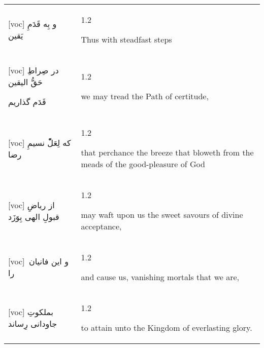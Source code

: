 \documentclass[11pt]{article}
\makeatletter
\newenvironment{orig}
  {\begin{farsi}[voc]}
  {\end{farsi}}
\newenvironment{trans}
  {\Large\begin{spacing}{1.2}\raggedright}
  {\end{spacing}}
\newenvironment{word}
  {\begin{tabular}[t]{p{2.75in}@{\hspace{3em}}p{2.875in}}}
  {\end{tabular}}
\newcommand{\ayat}[2]{\begin{orig}#1\end{orig} & \begin{trans}#2\end{trans}}
\makeatother
\begin{document}
\newpage

\begin{word}
\ayat{
و بِه قَدَمِ یَقین
}{Thus with steadfast steps} \vspace{-1ex}\\ \ayat{
در صِراطِ حَقُّ الیقین

قَدَم گذاریم
}{we may tread the Path of certitude,} \\ \ayat{
که لِعَلّْ نسیمِ رضا
}{that perchance the breeze that bloweth
from the meads of the good-pleasure of God} \vspace{-1ex}\\ \ayat{
از ریاضِ قبولِ الهی بِوَزَد
}{may waft upon us the sweet savours
    of divine acceptance,} \vspace{-1ex}\\ \ayat{
و این فانیان را
}{and cause us, vanishing mortals that we are,} \vspace{-1ex}\\ \ayat{
بملکوتِ جاودانی رِساند
}{to attain unto the Kingdom of everlasting glory.}
\end{word}

\newpage
\end{document}
